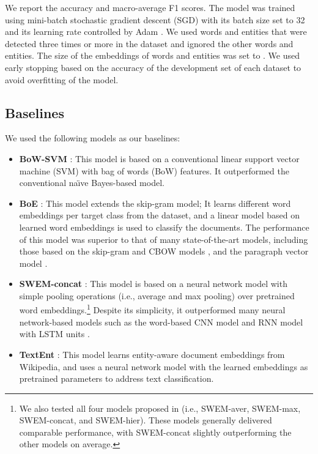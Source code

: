 \documentclass[11pt,a4paper]{article}
\begin{document}
    We report the accuracy and macro-average F1 scores.
    The model was trained using mini-batch stochastic gradient descent (SGD) with its batch size set to 32 and its learning rate controlled by Adam \cite{kingma2014adam}.
    We used words and entities that were detected three times or more in the dataset and ignored the other words and entities.
    The size of the embeddings of words and entities was set to .
    We used early stopping based on the accuracy of the development set of each dataset to avoid overfitting of the model.

    \subsection{Baselines}
    \label{subsec:text-classification-baselines}

    We used the following models as our baselines:

    \begin{itemize}
        \item \textbf{BoW-SVM} \cite{Jin2016}: This model is based on a conventional linear support vector machine (SVM) with bag of words (BoW) features.
        It outperformed the conventional na\"{\i}ve Bayes-based model.

        \item \textbf{BoE} \cite{Jin2016}:
        This model extends the skip-gram model;
        It learns different word embeddings per target class from the dataset, and a linear model based on learned word embeddings is used to classify the documents.
        The performance of this model was superior to that of many state-of-the-art models, including those based on the skip-gram and CBOW models \cite{Mikolov2013a}, and the paragraph vector model \cite{DBLP:conf/icml/LeM14}.

        \item \textbf{SWEM-concat} \cite{P18-1041}:
        This model is based on a neural network model with simple pooling operations (i.e., average and max pooling) over pretrained word embeddings.\footnote{We also tested all four models proposed in  (i.e., SWEM-aver, SWEM-max, SWEM-concat, and SWEM-hier). These models generally delivered comparable performance, with SWEM-concat slightly outperforming the other models on average.}
        Despite its simplicity, it outperformed many neural network-based models such as the word-based CNN model \cite{kim:2014:EMNLP2014} and RNN model with LSTM units \cite{P18-1041}.

        \item \textbf{TextEnt} \cite{C18-1016}:
        This model learns entity-aware document embeddings from Wikipedia, and uses a neural network model with the learned embeddings as pretrained parameters to address text classification.

    \end{itemize}
\end{document}
